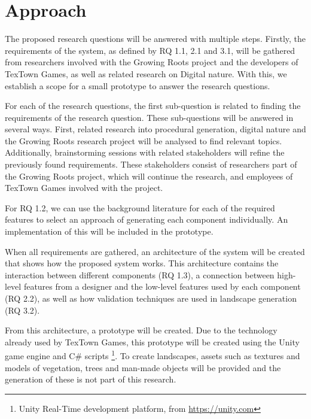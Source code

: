 \documentclass{article}
\begin{document}
\section{Approach}
The proposed research questions will be answered with multiple steps. Firstly, the requirements of the system, as defined by RQ 1.1, 2.1 and 3.1, will be gathered from researchers involved with the Growing Roots project and the developers of TexTown Games, as well as related research on Digital nature. With this, we establish a scope for a small prototype to answer the research questions.

For each of the research questions, the first sub-question is related to finding the requirements of the research question. These sub-questions will be answered in several ways. First, related research into procedural generation, digital nature and the Growing Roots research project will be analysed to find relevant topics. Additionally, brainstorming sessions with related stakeholders will refine the previously found requirements. These stakeholders consist of researchers part of the Growing Roots project, which will continue the research, and employees of TexTown Games involved with the project.

For RQ 1.2, we can use the background literature for each of the required features to select an approach of generating each component individually. An implementation of this will be included in the prototype.

When all requirements are gathered, an architecture of the system will be created that shows how the proposed system works. This architecture contains the interaction between different components (RQ 1.3), a connection between high-level features from a designer and the low-level features used by each component (RQ 2.2), as well as how validation techniques are used in landscape generation (RQ 3.2).

From this architecture, a prototype will be created. Due to the technology already used by TexTown Games, this prototype will be created using the Unity game engine and C\# scripts \footnote{Unity Real-Time development platform, from \url{https://unity.com}}. To create landscapes, assets such as textures and models of vegetation, trees and man-made objects will be provided and the generation of these is not part of this research.

\end{document}
